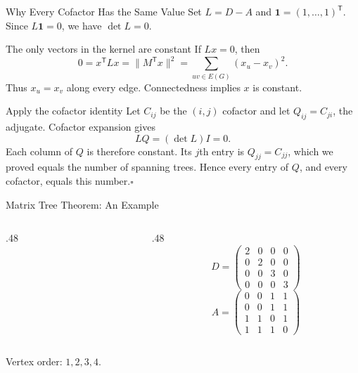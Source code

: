 \documentclass[aspectratio=169,11pt]{beamer}
\begin{document}
\begin{frame}[t]{Why Every Cofactor Has the Same Value}
\small
Set $L=D-A$ and $\mathbf1=(1,\ldots,1)^{\mathsf T}$. Since $L\mathbf1=0$, we have $\det L=0$.
\begin{block}{The only vectors in the kernel are constant}
If $Lx=0$, then
\[
0=x^{\mathsf T}Lx=\|M^{\mathsf T}x\|^2
=\sum_{uv\in E(G)}(x_u-x_v)^2.
\]
Thus $x_u=x_v$ along every edge. Connectedness implies $x$ is constant.
\end{block}
\begin{block}{Apply the cofactor identity}
Let $C_{ij}$ be the $(i,j)$ cofactor and let $Q_{ij}=C_{ji}$, the adjugate. Cofactor expansion gives
\[LQ=(\det L)I=0.\]
Each column of $Q$ is therefore constant. Its $j$th entry is $Q_{jj}=C_{jj}$, which we proved equals the number of spanning trees. Hence every entry of $Q$, and every cofactor, equals this number.\hfill$\square$
\end{block}
\end{frame}

\begin{frame}{Matrix Tree Theorem: An Example}
\normalsize
\begin{columns}[c,onlytextwidth]\begin{column}{.48\textwidth}\begin{center}\end{center}\end{column}\begin{column}{.48\textwidth}\[D=\begin{pmatrix}2&0&0&0\\0&2&0&0\\0&0&3&0\\0&0&0&3\end{pmatrix}\]\[A=\begin{pmatrix}0&0&1&1\\0&0&1&1\\1&1&0&1\\1&1&1&0\end{pmatrix}\]\end{column}\end{columns}\begin{center}Vertex order: $1,2,3,4$.\end{center}
\end{frame}
\end{document}
